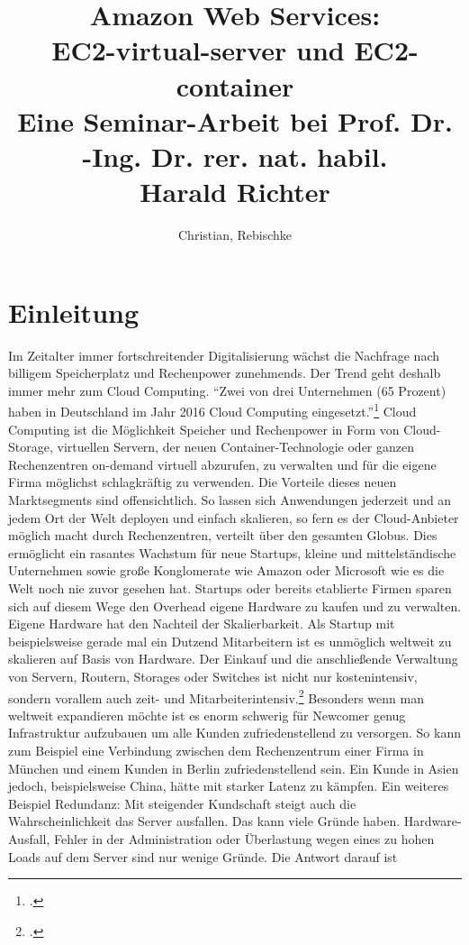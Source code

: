 \documentclass[titlepage]{report}
\title{Amazon Web Services:\\ EC2\hyp{}virtual\hyp{}server und EC2\hyp{}container \\
\small Eine Seminar\hyp{}Arbeit bei Prof. Dr. -Ing. Dr. rer. nat. habil. \\
Harald Richter}
\author{Christian, Rebischke}
\begin{document}
\maketitle
\tableofcontents
\chapter*{Einleitung}
Im Zeitalter immer fortschreitender Digitalisierung wächst die Nachfrage
nach billigem Speicherplatz und Rechenpower zunehmends. Der Trend geht
deshalb immer mehr zum Cloud Computing.  ``Zwei von drei Unternehmen (65
Prozent) haben in Deutschland im Jahr 2016 Cloud Computing
eingesetzt.''\footcite{SWG17} Cloud Computing ist die Möglichkeit
Speicher und Rechenpower in Form von Cloud\hyp{}Storage, virtuellen Servern,
der neuen Container\hyp{}Technologie oder ganzen Rechenzentren on\hyp{}demand
virtuell abzurufen, zu verwalten und für die eigene Firma möglichst
schlagkräftig zu verwenden. Die Vorteile dieses neuen Marktsegments sind
offensichtlich. So lassen sich Anwendungen jederzeit und an jedem Ort
der Welt deployen und einfach skalieren, so fern es der Cloud\hyp{}Anbieter
möglich macht durch Rechenzentren, verteilt über den gesamten Globus.
Dies ermöglicht ein rasantes Wachstum für neue Startups, kleine und
mittelständische Unternehmen sowie große Konglomerate wie Amazon oder
Microsoft wie es die Welt noch nie zuvor gesehen hat. Startups oder
bereits etablierte Firmen sparen sich auf diesem Wege den Overhead
eigene Hardware zu kaufen und zu verwalten.  Eigene Hardware hat den
Nachteil der Skalierbarkeit. Als Startup mit beispielsweise gerade mal
ein Dutzend Mitarbeitern ist es unmöglich weltweit zu skalieren auf
Basis von Hardware. Der Einkauf und die anschließende Verwaltung von
Servern, Routern, Storages oder Switches ist nicht nur kostenintensiv,
sondern vorallem auch zeit\hyp{} und Mitarbeiterintensiv.\footcite[S.
1]{RZ17} Besonders wenn man weltweit expandieren möchte ist es enorm
schwerig für Newcomer genug Infrastruktur aufzubauen um alle Kunden
zufriedenstellend zu versorgen.  So kann zum Beispiel eine Verbindung
zwischen dem Rechenzentrum einer Firma in München und einem Kunden in
Berlin zufriedenstellend sein. Ein Kunde in Asien jedoch, beispielsweise
China, hätte mit starker Latenz zu kämpfen. Ein weiteres Beispiel
Redundanz: Mit steigender Kundschaft steigt auch die Wahrscheinlichkeit
das Server ausfallen. Das kann viele Gründe haben. Hardware\hyp{}Ausfall,
Fehler in der Administration oder Überlastung wegen eines zu hohen Loads
auf dem Server sind nur wenige Gründe. Die Antwort darauf ist
\end{document}
